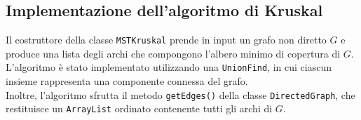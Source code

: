 \documentclass[10pt, oneside]{article}
\begin{document}
\subsection{Implementazione dell’algoritmo di Kruskal}
Il costruttore della classe \texttt{MSTKruskal} prende in input un grafo non diretto $G$ e produce una lista degli archi che compongono l'albero minimo di copertura di $G$.\\
L'algoritmo è stato implementato utilizzando una \texttt{UnionFind}, in cui ciascun insieme rappresenta una componente connessa del grafo.\\
Inoltre, l'algoritmo sfrutta il metodo \texttt{getEdges()} della classe \texttt{DirectedGraph}, che restituisce un \texttt{ArrayList} ordinato contenente tutti gli archi di $G$.
\end{document}

